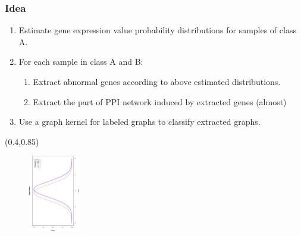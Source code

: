 \documentclass{beamer}
\begin{document}
\begin{frame}
  \frametitle{Idea}
  \begin{enumerate}
\footnotesize
  \item Estimate gene expression value probability distributions for samples of class A. 
  \item For each sample in class A and B:
    \begin{enumerate}
\scriptsize
    \item Extract abnormal genes according to above estimated distributions.
    \item Extract the part of PPI network induced by extracted genes (almost)
    \end{enumerate}
  \item Use a graph kernel for labeled graphs to classify extracted graphs.
  \end{enumerate}
  \begin{textblock*}{\paperwidth}(0.4\textwidth,0.85\textheight)
    \raggedright
  \begin{figure}
    \includegraphics[angle=270,width=0.2\textwidth]{signal-nodes}
  \end{figure}
  \end{textblock*}
\end{frame}
\end{document}
